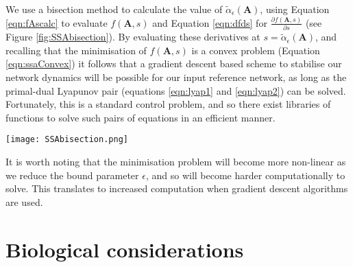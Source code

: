 \documentclass[12pt, a4paper]{article}
\begin{document}
We use a bisection method to calculate the value of $\tilde{\alpha}_\epsilon(\mathbf{A})$, using Equation \ref{eqn:fAscalc} to evaluate $f(\mathbf{A},s)$ and Equation \ref{eqn:dfds} for $\frac{\partial f(\mathbf{A},s)}{\partial s}$ (see Figure \ref{fig:SSAbisection}).  By evaluating these derivatives at $s = \tilde{\alpha}_\epsilon(\mathbf{A})$, and recalling that the minimisation of $f(\mathbf{A},s)$ is a convex problem (Equation \ref{eqn:ssaConvex}) it follows that a gradient descent based scheme to stabilise our network dynamics will be possible for our input reference network, as long as the primal-dual Lyapunov pair (equations \ref{eqn:lyap1} and \ref{eqn:lyap2}) can be solved.  Fortunately, this is a standard control problem, and so there exist libraries of functions to solve such pairs of equations in an efficient manner.

\begin{SCfigure}
    \centering
    \texttt{[image: SSAbisection.png]}
    \caption{A typical form for $f(\mathbf{A},s)$.  A bisection method is used, evaluating $f(.)$ and $\frac{\partial f(\mathbf{A},s)}{\partial s}$ to find $\tilde{\alpha}_\epsilon(\mathbf{A})$. \\(Figure adapted from Vanbiervliet \emph{et al.} (2009).)}
    \label{fig:SSAbisection}
\end{SCfigure}


 It is worth noting that the minimisation problem will become more non-linear as we reduce the bound parameter $\epsilon$, and so will become harder computationally to solve.  This translates to increased computation when gradient descent algorithms are used.

\FloatBarrier
\pagebreak
\section{Biological considerations}
\label{sec:biolCon}
\FloatBarrier
\end{document}
